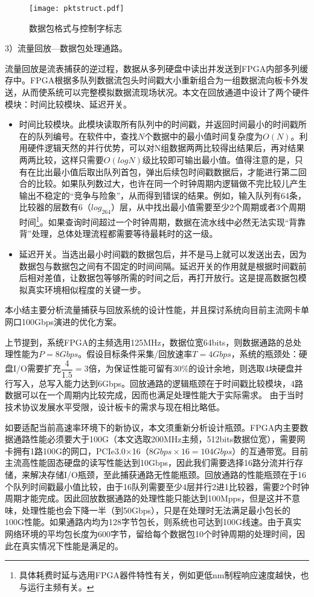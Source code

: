 \begin{figure}[!ht]
	\centering
	\texttt{[image: pktstruct.pdf]}
	\caption{数据包格式与控制字标志} \label{fig:pktstruct}
\end{figure}

3）流量回放---数据包处理通路。

流量回放是流表捕获的逆过程，数据从多列硬盘中读出并发送到FPGA内部多列缓存中。FPGA根据多队列数据流包头时间戳大小重新组合为一组数据流向板卡外发送，从而使系统可以完整模拟数据流现场状况。本文在回放通道中设计了两个硬件模块：时间比较模块、延迟开关。

\begin{itemize}
	\item 时间比较模块。此模块读取所有队列中的时间戳，并返回时间最小的时间戳所在的队列编号。在软件中，查找$N$个数据中的最小值时间复杂度为$ O(N) $。利用硬件逻辑天然的并行优势，可以对N组数据两两比较得出结果后，再对结果两两比较，这样只需要$ O(log N) $级比较即可输出最小值。值得注意的是，只有在比出最小值后取出队列首包，弹出后续包时间戳数据后，才能进行第二回合的比较。如果队列数过大，也许在同一个时钟周期内逻辑做不完比较儿产生输出不稳定的“竞争与险象”，从而得到错误的结果。例如，输入队列有64条，比较器的层数有6（$ log_264 $）层，从中找出最小值需要至少2个周期或者3个周期时间\footnote{具体耗费时延与选用FPGA器件特性有关，例如更低nm制程响应速度越快，也与运行主频有关。}。如果查询时间超过一个时钟周期，数据在流水线中必然无法实现“背靠背”处理，总体处理流程都需要等待最耗时的这一级。
	\item 延迟开关。当选出最小时间戳的数据包后，并不是马上就可以发送出去，因为数据包与数据包之间有不固定的时间间隔。延迟开关的作用就是根据时间戳前后相对差值，让数据包等够所需的时间之后，再打开放行。这是提高数据包模拟真实环境相似程度的关键一步。
\end{itemize}


本小结主要分析流量捕获与回放系统的设计性能，并且探讨系统向目前主流网卡单网口100Gbps演进的优化方案。

上节提到，系统FPGA的主频选用125MHz，数据位宽64bits，则数据通路的总处理性能为$ P=8Gbps $。假设目标条件采集/回放速率$ T=4Gbps $，系统的瓶颈处：硬盘I/O需要扩充$ \dfrac{4}{1.5}=3 $倍，为保证性能可留有30\%的设计余地，则选取4块硬盘并行写入，总写入能力达到6Gbps。回放通路的逻辑瓶颈在于时间戳比较模块，4路数据可以在一个周期内比较完成，因而也满足处理性能大于实际需求。
由于当时技术协议发展水平受限，设计板卡的需求与现在相比略低。

如要适配当前高速率环境下的新协议，本文须重新分析设计瓶颈。FPGA内主要数据通路性能必须要大于100G（本文选取200MHz主频，512bits数据位宽），需要网卡拥有1路100G的网口，PCIe3.0$ \times $16（$8Gbps\times 16=104Gbps$）的互通带宽。目前主流高性能固态硬盘的读写性能达到10Gbps，因此我们需要选择16路分流并行存储，来解决存储I/O瓶颈，至此捕获通路无性能瓶颈。回放通路的性能瓶颈在于16个队列时间戳最小值比较，由于16队列需要至少4层并行2进1比较器，需要2个时钟周期才能完成。因此回放数据通路的处理性能只能达到100Mpps，但是这并不意味，处理性能也会下降一半（到50Gbps），只是在处理时无法满足最小包长的100G性能。如果通路内均为128字节包长，则系统也可达到100G线速。由于真实网络环境的平均包长度为600字节，留给每个数据包10个时钟周期的处理时间，因此在真实情况下性能是满足的。



